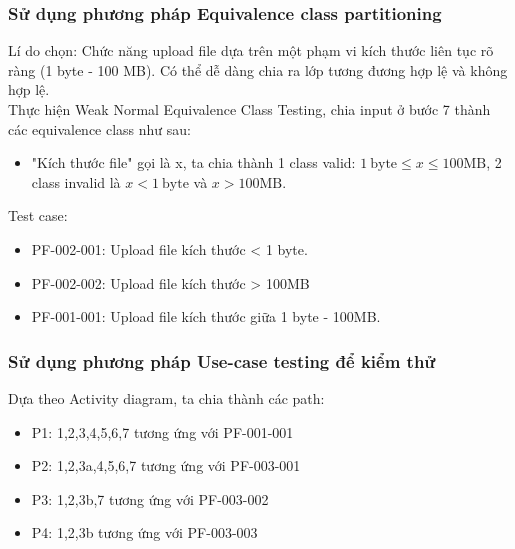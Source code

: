 \subsubsection{Sử dụng phương pháp Equivalence class partitioning}
Lí do chọn: Chức năng upload file dựa trên một phạm vi kích thước liên tục rõ ràng (1 byte - 100 MB). Có thể dễ dàng chia ra lớp tương đương hợp lệ và không hợp lệ. \\
Thực hiện Weak Normal Equivalence Class Testing, chia input ở bước 7 thành các equivalence class như sau:
\begin{itemize}
    \item "Kích thước file" gọi là x, ta chia thành 1 class valid: \(1\ \text{byte} \leq x \leq 100\text{MB}\), 2 class invalid là \(x < 1\ \text{byte}\) và \(x > 100\text{MB}\).
\end{itemize}
Test case:
\begin{itemize}
    \item PF-002-001: Upload file kích thước < 1 byte.
    \item PF-002-002: Upload file kích thước > 100MB
    \item PF-001-001: Upload file kích thước giữa 1 byte - 100MB.
\end{itemize}

\subsubsection{Sử dụng phương pháp Use-case testing để kiểm thử}
Dựa theo Activity diagram, ta chia thành các path:
\begin{itemize}
    \item P1: 1,2,3,4,5,6,7 tương ứng với PF-001-001
    \item P2: 1,2,3a,4,5,6,7 tương ứng với PF-003-001
    \item P3: 1,2,3b,7 tương ứng với PF-003-002
    \item  P4: 1,2,3b tương ứng với PF-003-003
\end{itemize}
\newpage